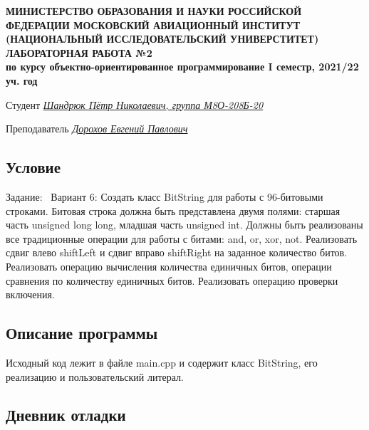 \documentclass[12pt]{article}
\begin{document}
\begin{titlepage}
\begin{center}
\textbf{МИНИСТЕРСТВО ОБРАЗОВАНИЯ И НАУКИ РОССИЙСКОЙ ФЕДЕРАЦИИ
\medskip
МОСКОВСКИЙ АВИАЦИОННЫЙ ИНСТИТУТ
(НАЦИОНАЛЬНЫЙ ИССЛЕДОВАТЕЛЬСКИЙ УНИВЕРСТИТЕТ)
\vfill\vfill
{\Huge ЛАБОРАТОРНАЯ РАБОТА №2} \\
по курсу объектно-ориентированное программирование
I семестр, 2021/22 уч. год}
\end{center}
\vfill

Студент \uline{\it {Шандрюк Пётр Николаевич, группа М8О-208Б-20}\hfill}

Преподаватель \uline{\it {Дорохов Евгений Павлович}\hfill}

\vfill
\end{titlepage}

\subsection*{Условие}

Задание: \
Вариант 6: Создать класс BitString для работы с 96-битовыми строками. Битовая
строка должна быть представлена двумя полями: старшая часть unsigned
long long, младшая часть unsigned int. Должны быть реализованы все
традиционные операции для работы с битами: and, or, xor, not. Реализовать
сдвиг влево shiftLeft и сдвиг вправо shiftRight на заданное количество битов.
Реализовать операцию вычисления количества единичных битов, операции
сравнения по количеству единичных битов. Реализовать операцию проверки
включения.

\subsection*{Описание программы}

Исходный код лежит в файле main.cpp и содержит класс BitString, его реализацию и пользовательский литерал.


\subsection*{Дневник отладки}
\end{document}
